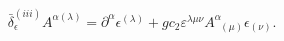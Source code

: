 \begin{equation}
\bar{\delta}_{\epsilon }^{(iii)}A^{\alpha (\lambda )}=\partial ^{\alpha
}\epsilon ^{(\lambda )}+gc_{2}\varepsilon ^{\lambda \mu \nu }A_{\;\;(\mu
)}^{\alpha }\epsilon _{(\nu )}.  \label{bf103}
\end{equation}

